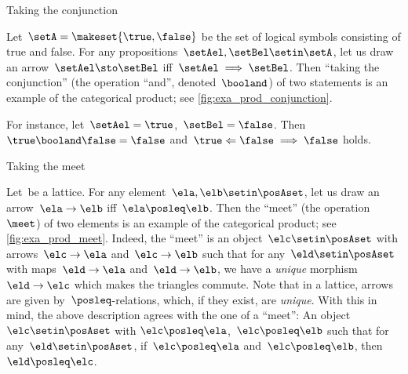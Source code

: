 \begin{marginfigure}
    \centering
    \caption{Taking the conjunction}
    \label{fig:exa_prod_conjunction}
\end{marginfigure}

\begin{example}
    \label{exa:conjunction-as-prod}
    Let~$\setA = \makeset{ \true, \false }$ be the set of logical symbols consisting of true and false.
    For any propositions~$\setAel, \setBel  \setin \setA$, let us draw an arrow~$\setAel \sto \setBel$ iff~$\setAel \implies \setBel$.
    Then ``taking the conjunction'' (the operation ``and'', denoted~$\booland$) of two statements is an example of the categorical product; see \cref{fig:exa_prod_conjunction}.

    For instance, let~$\setAel = \true$,~$\setBel = \false$.
    Then~$\true \booland \false = \false$ and~$\true \Leftarrow \false \implies \false$ holds.
\end{example}

\begin{marginfigure}
    \centering
    \caption{Taking the meet}
    \label{fig:exa_prod_meet}
\end{marginfigure}

\begin{example}
    \label{exa:meet-as-prod}
    Let~\posA be a lattice.
    For any element~$\ela, \elb \setin \posAset$, let us draw an arrow~$\ela \to \elb$ iff~$\ela \posleq \elb$.
    Then the ``meet'' (the operation~$\meet$) of two elements is an example of the categorical product; see \cref{fig:exa_prod_meet}.
    Indeed, the ``meet'' is an object~$\elc \setin \posAset$ with arrows~$\elc\to \ela$ and~$\elc \to \elb$ such that for any~$\eld\setin \posAset$ with maps~$\eld\to \ela$ and~$\eld\to \elb$, we have a \emph{unique} morphism~$\eld\to \elc$ which makes the triangles commute.
    Note that in a lattice, arrows are given by~$\posleq$-relations, which, if they exist, are \emph{unique}.
    With this in mind, the above description agrees with the one of a ``meet'':
    An object~$\elc\setin \posAset$ with $\elc\posleq \ela$,~$\elc\posleq \elb$ such that for any~$\eld\setin \posAset$, if~$\elc\posleq \ela$ and~$\elc\posleq \elb$, then~$\eld\posleq \elc$.
\end{example}

\begin{marginfigure}
    \centering
    \caption{}
    \label{fig:prod_generic}
\end{marginfigure}

